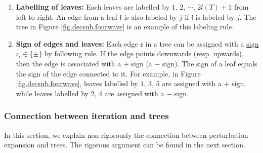 \begin{defn}
\begin{enumerate}
 \item \textbf{Labelling of leaves:} Each leaves are labelled by $1$, $2$, $\cdots$, $2l(T)+1$ from left to right. An edge from a leaf $\mathfrak{l}$ is also labeled by $j$ if $\mathfrak{l}$ is labeled by $j$. The tree in Figure \ref{fig.decsub.fourwave} is an example of this labeling rule.


 \item \textbf{Sign of edges and leaves:} Each edge $\mathfrak{e}$ in a tree can be assigned with a \underline{sign} $\iota_{\mathfrak{e}}\in\{\pm\}$ by following rule. If the edge points downwards (resp. upwards), then the edge is associated with a $+$ sign (a $-$ sign). The sign of a leaf equals the sign of the edge connected to it. For example, in Figure \ref{fig.decsub.fourwave}, leaves labelled by $1$, $3$, $5$ are assigned with a $+$ sign, while leaves labelled by $2$, $4$ are assigned with a $-$ sign.
 

\end{enumerate}

 


\end{defn}





\subsubsection{Connection between iteration and trees}\label{sec.connection.fourwave} In this section, we explain non-rigorously the connection between perturbation expansion and trees. The rigorous argument can be found in the next section. 

